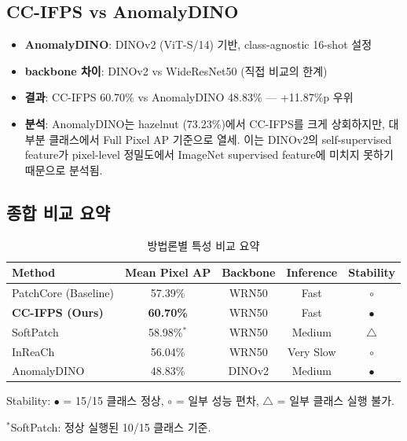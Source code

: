 \documentclass[11pt,a4paper]{article}
\begin{document}
\subsection{CC-IFPS vs AnomalyDINO}

\begin{itemize}
  \item \textbf{AnomalyDINO}: DINOv2 (ViT-S/14) 기반, class-agnostic 16-shot 설정
  \item \textbf{backbone 차이}: DINOv2 vs WideResNet50 (직접 비교의 한계)
  \item \textbf{결과}: CC-IFPS 60.70\% vs AnomalyDINO 48.83\% — +11.87\%p 우위
  \item \textbf{분석}: AnomalyDINO는 hazelnut (73.23\%)에서 CC-IFPS를 크게 상회하지만, 대부분 클래스에서 Full Pixel AP 기준으로 열세. 이는 DINOv2의 self-supervised feature가 pixel-level 정밀도에서 ImageNet supervised feature에 미치지 못하기 때문으로 분석됨.
\end{itemize}

\subsection{종합 비교 요약}

\begin{table}[H]
\centering
\caption{방법론별 특성 비교 요약}
\label{tab:method_summary}
\small
\begin{tabular}{l c c c c}
\toprule
\textbf{Method} & \textbf{Mean Pixel AP} & \textbf{Backbone} & \textbf{Inference} & \textbf{Stability} \\
\midrule
PatchCore (Baseline) & 57.39\% & WRN50 & Fast & $\circ$ \\
\textbf{CC-IFPS (Ours)} & \textbf{60.70\%} & WRN50 & Fast & $\bullet$ \\
SoftPatch & 58.98\%$^*$ & WRN50 & Medium & $\triangle$ \\
InReaCh & 56.04\% & WRN50 & Very Slow & $\circ$ \\
AnomalyDINO & 48.83\% & DINOv2 & Medium & $\bullet$ \\
\bottomrule
\end{tabular}
\vspace{2mm}

\small{Stability: $\bullet$ = 15/15 클래스 정상, $\circ$ = 일부 성능 편차, $\triangle$ = 일부 클래스 실행 불가.}

\small{$^*$SoftPatch: 정상 실행된 10/15 클래스 기준.}
\end{table}


\end{document}
